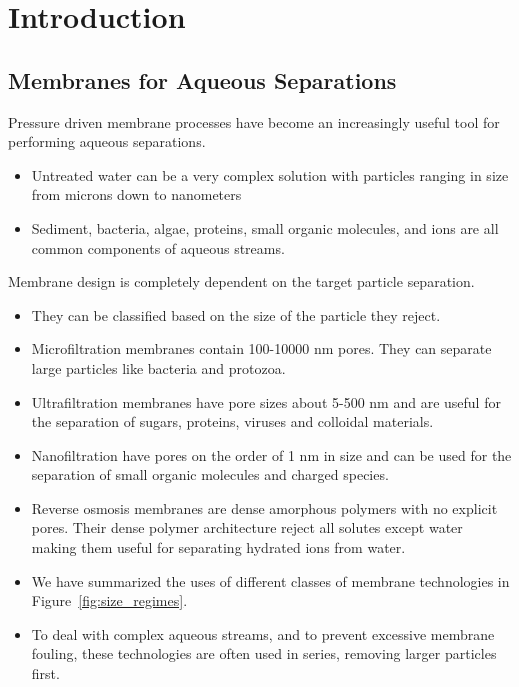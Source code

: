 \chapter{Introduction}\label{chapter:intro}

  \section{Membranes for Aqueous Separations}
  
  Pressure driven membrane processes have become an increasingly useful tool for
  performing aqueous separations.
  \begin{itemize}
    \item Untreated water can be a very complex solution with particles ranging
    in size from microns down to nanometers
    \item Sediment, bacteria, algae, proteins, small organic molecules, and ions
    are all common components of aqueous streams.
  \end{itemize}
  
  \noindent Membrane design is completely dependent on the target particle separation. 
  \begin{itemize}
    \item They can be classified based on the size of the particle they reject.
    \item Microfiltration membranes contain 100-10000 nm pores. They can separate large
    particles like bacteria and protozoa.~\cite{ma_functionalized_2014}
    \item Ultrafiltration membranes have pore sizes about 5-500 nm and are useful for the 
    separation of sugars, proteins, viruses and colloidal materials.~\cite{davey_ultrafiltration_2009}
    \item Nanofiltration have pores on the order of 1 nm in size and can be used for the separation
    of small organic molecules and charged species.~\cite{van_der_bruggen_review_2003}
    \item Reverse osmosis membranes are dense amorphous polymers with no explicit pores. Their
    dense polymer architecture reject all solutes except water making them useful for 
    separating hydrated ions from water.~\cite{warsinger_review_2018}
    \item We have summarized the uses of different classes of membrane 
    technologies in Figure~\ref{fig:size_regimes}.
    \item To deal with complex aqueous streams, and to prevent excessive membrane fouling, 
    these technologies are often used in series, removing larger particles first.~\cite{goosen_fouling_2005}
  \end{itemize}
  
